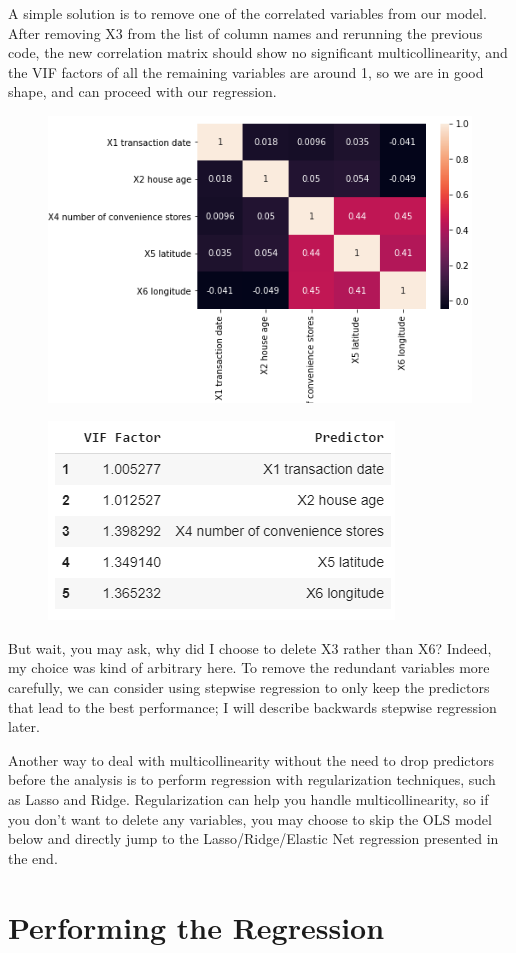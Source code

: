 \documentclass{article}
\begin{document}
A simple solution is to remove one of the correlated variables from our model. After removing X3 from the list of column names and rerunning the previous code, the new correlation matrix should show no significant multicollinearity, and the VIF factors of all the remaining variables are around 1, so we are in good shape, and can proceed with our regression.
\begin{figure}[H]\includegraphics[width=0.8\linewidth]{12}\end{figure}
\begin{figure}[H]\centering\includegraphics[width=0.5\linewidth]{13}\end{figure}
But wait, you may ask, why did I choose to delete X3 rather than X6? Indeed, my choice was kind of arbitrary here. To remove the redundant variables more carefully, we can consider using stepwise regression to only keep the predictors that lead to the best performance; I will describe backwards stepwise regression later.

Another way to deal with multicollinearity without the need to drop predictors before the analysis is to perform regression with regularization techniques, such as Lasso and Ridge. Regularization can help you handle multicollinearity, so if you don't want to delete any variables, you may choose to skip the OLS model below and directly jump to the Lasso/Ridge/Elastic Net regression presented in the end.

\section*{Performing the Regression}
\end{document}
